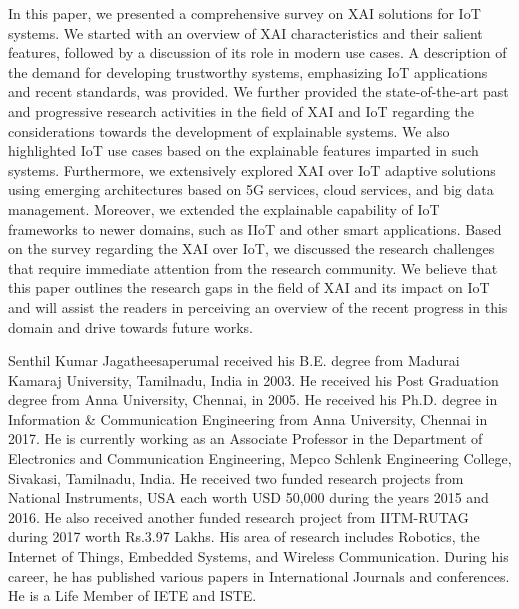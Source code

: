 \documentclass[journal]{IEEEtran}
\begin{document}
In this paper, we presented a comprehensive survey on XAI solutions for IoT systems. We started with an overview of XAI characteristics and their salient features, followed by a discussion of its role in modern use cases. A description of the demand for developing trustworthy systems, emphasizing IoT applications and recent standards, was provided. We further provided the state-of-the-art past and progressive research activities in the field of XAI and IoT regarding the considerations towards the development of explainable systems. We also highlighted IoT use cases based on the explainable features imparted in such systems. Furthermore, we extensively explored XAI over IoT adaptive solutions using emerging architectures based on 5G services, cloud services, and big data management. Moreover, we extended the explainable capability of IoT frameworks to newer domains, such as IIoT and other smart applications. Based on the survey regarding the XAI over IoT, we discussed the research challenges that require immediate attention from the research community. We believe that this paper outlines the research gaps in the field of XAI and its impact on IoT and will assist the readers in perceiving an overview of the recent progress in this domain and drive towards future works.
\ifCLASSOPTIONcaptionsoff
  \newpage
\fi


\begin{IEEEbiography}
{Senthil Kumar Jagatheesaperumal}
 received his B.E. degree from Madurai Kamaraj University, Tamilnadu, India in 2003. He received his Post Graduation degree from Anna University, Chennai, in 2005. He received his Ph.D. degree in Information \& Communication Engineering from Anna University, Chennai in 2017. He is currently working as an Associate Professor in the Department of Electronics and Communication Engineering, Mepco Schlenk Engineering College, Sivakasi, Tamilnadu, India. He received two funded research projects from National Instruments, USA each worth USD 50,000 during the years 2015 and 2016. He also received another funded research project from IITM-RUTAG during 2017 worth Rs.3.97 Lakhs. His area of research includes Robotics, the Internet of Things, Embedded Systems, and Wireless Communication. During his career, he has published various papers in International Journals and conferences. He is a Life Member of IETE and ISTE.
\end{IEEEbiography}
\end{document}
